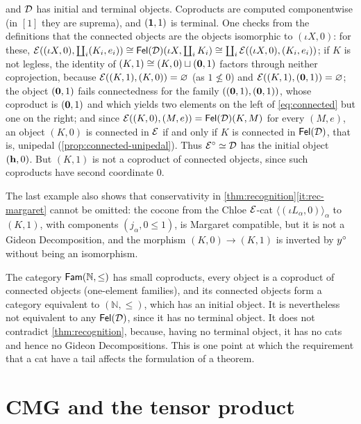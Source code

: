 \begin{counterexample}
\begin{enumerate}
  and $\mathcal{D}$ has initial and terminal objects. Coproducts are computed
  componentwise (in $[1]$ they are suprema), and $(\mathbf{1},1)$ is terminal. One
  checks from the definitions that the connected objects are the objects
  isomorphic to $(\iota X,0)$: for these,
  $\mathcal{E}((\iota X,0),\coprod_i(K_i,e_i))\cong\mathsf{Fel}(\mathcal{D})(\iota X,\coprod_iK_i)\cong\coprod_i\mathcal{E}((\iota X,0),(K_i,e_i))$;
  if $K$ is not legless, the identity of $(K,1)\cong(K,0)\sqcup(\mathbf{0},1)$
  factors through neither coprojection, because $\mathcal{E}((K,1),(K,0))=\varnothing$
  (as $1\not\le0$) and $\mathcal{E}((K,1),(\mathbf{0},1))=\varnothing$; the object
  $(\mathbf{0},1)$ fails connectedness for the family $((\mathbf{0},1),(\mathbf{0},1))$,
  whose coproduct is $(\mathbf{0},1)$ and which yields two elements on the left of
  \eqref{eq:connected} but one on the right;
  and since $\mathcal{E}((K,0),(M,e))=\mathsf{Fel}(\mathcal{D})(K,M)$ for every $(M,e)$, an object
  $(K,0)$ is connected in $\mathcal{E}$ if and only if $K$ is connected in $\mathsf{Fel}(\mathcal{D})$,
  that is, unipedal (\cref{prop:connected-unipedal}). Thus $\mathcal{E}^\circ\simeq\mathcal{D}$ has the initial object
  $(\mathbf{h},0)$. But $(K,1)$ is not a coproduct of connected objects, since such
  coproducts have second coordinate $0$.
\end{enumerate}
The last example also shows that conservativity in
\cref{thm:recognition}\ref{it:rec-margaret} cannot be omitted: the cocone from
the Chloe $\mathcal{E}$-cat $\langle(\iota L_\alpha,0)\rangle_\alpha$ to $(K,1)$, with
components $(j_\alpha,0\le1)$, is Margaret compatible, but it is not a Gideon
Decomposition, and the morphism $(K,0)\to(K,1)$ is inverted by $y^\circ$ without
being an isomorphism.
\end{counterexample}

\begin{remark}\label{rem:recognition-tail}
The category $\mathsf{Fam}(\mathbb N,\le)$ has small coproducts, every object is a
coproduct of connected objects (one-element families), and its connected objects
form a category equivalent to $(\mathbb N,\le)$, which has an initial object. It is
nevertheless not equivalent to any $\mathsf{Fel}(\mathcal{D})$, since it has no terminal object.
It does not contradict \cref{thm:recognition}, because, having no terminal object,
it has no cats and hence no Gideon Decompositions. This is one point at which the
requirement that a cat have a tail affects the formulation of a theorem.
\end{remark}

\section{CMG and the tensor product}\label{sec:cmg-tensor}

